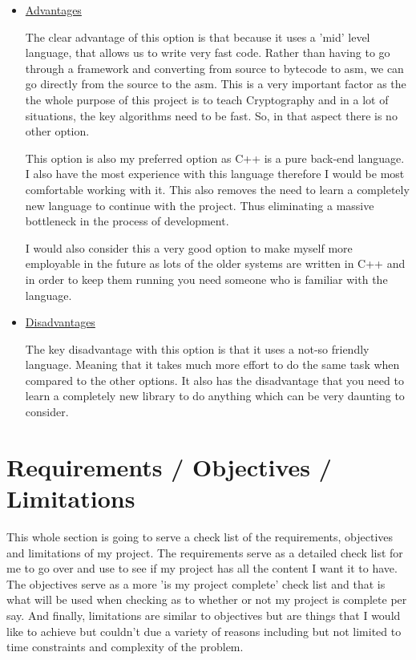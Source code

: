 \begin{itemize}
\item{
\underline{Advantages}

The clear advantage of this option is that because it uses a 'mid' level language, that allows us to write very fast code. Rather than having to go through a framework and converting from source to bytecode to asm, we can go directly from the source to the asm. This is a very important factor as the the whole purpose of this project is to teach Cryptography and in a lot of situations, the key algorithms need to be fast. So, in that aspect there is no other option.

This option is also my preferred option as C++ is a pure back-end language. I also have the most experience with this language therefore I would be most comfortable working with it. This also removes the need to learn a completely new language to continue with the project. Thus eliminating a massive bottleneck in the process of development.

I would also consider this a very good option to make myself more employable in the future as lots of the older systems are written in C++ and in order to keep them running you need someone who is familiar with the language. 

}
\item{
\underline{Disadvantages}

The key disadvantage with this option is that it uses a not-so friendly language. Meaning that it takes much more effort to do the same task when compared to the other options. It also has the disadvantage that you need to learn a completely new library to do anything which can be very daunting to consider. 

}
\end{itemize}

\section{Requirements / Objectives / Limitations}

This whole section is going to serve a check list of the requirements, objectives and limitations of my project. The requirements serve as a detailed check list for me to go over and use to see if my project has all the content I want it to have. The objectives serve as a more 'is my project complete' check list and that is what will be used when checking as to whether or not my project is complete per say. And finally, limitations are similar to objectives but are things that I would like to achieve but couldn't due a variety of reasons including but not limited to time constraints and complexity of the problem.

